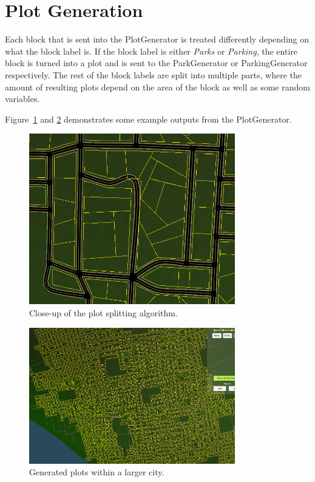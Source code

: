 \section{Plot Generation}
Each block that is sent into the PlotGenerator is treated differently depending on what the block label is. 
If the block label is either \textit{Parks} or \textit{Parking}, the entire block is turned into a plot and is sent to the ParkGenerator or ParkingGenerator respectively.
The rest of the block labels are split into multiple parts, where the amount of resulting plots depend on the area of the block as well as some random variables. 

Figure~\ref{fig:plot2} and \ref{fig:plot} demonstrates some example outputs from the PlotGenerator.

\begin{figure}[H]
  \centering

  \includegraphics[width=0.8\textwidth]{figure/plot2.png}
  \caption{Close-up of the plot splitting algorithm.}

  \label{fig:plot2}
\end{figure}

\begin{figure}[H]
  \centering

  \includegraphics[width=0.8\textwidth]{figure/plot.png}
  \caption{Generated plots within a larger city.}

  \label{fig:plot}
\end{figure}

